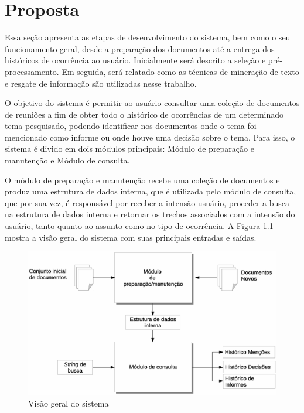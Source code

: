 \chapter{Proposta}\label{cap3}


Essa seção apresenta as etapas de desenvolvimento do sistema, bem como o seu funcionamento geral, desde a preparação dos documentos até a entrega dos históricos de ocorrência ao usuário. Inicialmente será descrito a seleção e pré-processamento. Em seguida, será relatado como as técnicas de mineração de texto e resgate de informação são utilizadas nesse trabalho.

O objetivo do sistema é permitir ao usuário consultar uma coleção de documentos de reuniões a fim de obter todo o histórico de ocorrências de um determinado tema pesquisado, podendo identificar nos documentos onde o tema foi mencionado como informe ou onde houve uma decisão sobre o tema. Para isso, o sistema é divido em dois módulos principais: Módulo de preparação e manutenção e Módulo de consulta.



O módulo de preparação e manutenção recebe uma coleção de documentos e produz uma estrutura de dados interna, que é utilizada pelo módulo de consulta, que por sua vez, é responsável por receber a intensão usuário, proceder a busca na estrutura de dados interna e retornar os trechos associados com a intensão do usuário, tanto quanto ao assunto como no tipo de ocorrência. A Figura \ref{fig:visao-geral} mostra a visão geral do sistema com suas principais entradas e saídas. 


  \begin{figure}[!h]
	  \centering
	  \includegraphics[width=0.69\paperwidth]{conteudo/capitulos/figs/visao-geral-3.eps}
	  \caption{Visão geral do sistema}
	  \label{fig:visao-geral}
  \end{figure}


